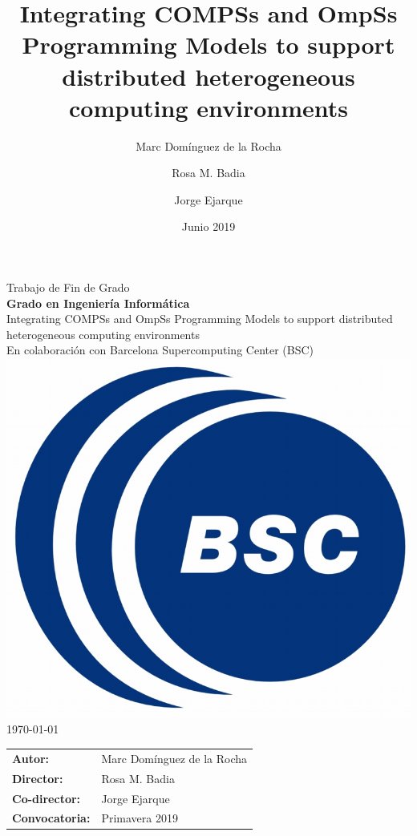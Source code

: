 \documentclass[a4paper, titlepage, twoside, openright]{report}
\title{Integrating COMPSs and OmpSs Programming Models to support distributed heterogeneous computing environments}
\author
{
Marc Domínguez de la Rocha
\and
Rosa M. Badia
\and
Jorge Ejarque
}
\date{Junio 2019}
\begin{document}
  {\centering
    {\Huge Trabajo de Fin de Grado}\\
    \vspace{5mm}
    {\Large \textbf{Grado en Ingeniería Informática}}\\
    \vspace{15mm}
    \LARGE {Integrating COMPSs and OmpSs Programming Models to
	support distributed heterogeneous computing environments}\\
    \vspace{15mm}
    \Large {En colaboración con Barcelona Supercomputing Center (BSC)}\\
    \vspace{5mm}
    \includegraphics[scale=0.3]{images/portada/BSC-Logo.png}\\
    \vspace{5mm}
    \Large \today \\
    }
    \vspace{17mm}
    \hspace{2mm}
    \begin{tabular}{l@{ } l}
        \vspace{5mm}
        \Large \textbf{Autor:} & \Large{Marc Domínguez de la Rocha} \\
        \vspace{5mm}
        \Large\textbf{Director:} & \Large{Rosa M. Badia}\\
        \vspace{5mm}
        \Large\textbf{Co-director:} & \Large{Jorge Ejarque}\\
        \vspace{5mm}
         \Large\textbf{Convocatoria: } & \Large{Primavera 2019}\\
    \end{tabular}\par
\end{document}
